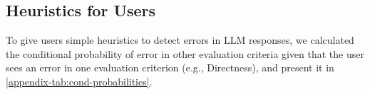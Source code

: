 \if {}
    \subsection{Heuristics for Users} \label{gpt-eval-results}
\fi

To give users simple heuristics to detect errors in LLM responses, we calculated the conditional probability of error in other evaluation criteria given that the user sees an error in one evaluation criterion (e.g., Directness), and present it in \cref{appendix-tab:cond-probabilities}.

\begin{table}[!h]
    \setlength{\abovecaptionskip}{0pt}
\caption{Given error in one criterion, conditional probabilities of error rates in other evaluation criteria in GPT responses.}
\label{appendix-tab:cond-probabilities}
\if {}
\fi
{}
\end{table}







